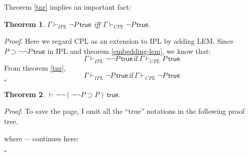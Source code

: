 \documentclass{article}
\newtheorem{theorem}{Theorem}[section]
\newenvironment{proof}{\emph{Proof}.}{\hfill$\square$}
\newcommand{\true}{\,\textsf{true}}
\begin{document}
Theorem \ref{tnr} implies an important fact:
\begin{theorem}
    $\Gamma \vdash_{IPL} \neg P \true$ \emph{iff} $\Gamma \vdash_{CPL} \neg P \true$.
\end{theorem}
\begin{proof}
    Here we regard CPL as an extension to IPL by adding LEM.
    Since $P\supset \neg\neg P\true$ in IPL and theorem \ref{embedding-lem}, we know that:
    \[
        \Gamma \vdash_{IPL} \neg\neg P\true \, \text{if}\, \Gamma \vdash_{CPL} P\true
    \]
    From theorem \ref{tnr},
    \[
        \Gamma \vdash_{IPL} \neg P\true \, \text{if}\, \Gamma \vdash_{CPL} \neg P\true
    \]
\end{proof}

\begin{theorem}
    $\vdash \neg\neg (\neg\neg P\supset P)\true$.
\end{theorem}
\begin{proof}
    To save the page, I omit all the ``\textsf{true}'' notations in the following proof tree.
    \begin{mathpar}
    \end{mathpar}
    where $\cdots$ continues here:
    \begin{mathpar}

    \end{mathpar}
\end{proof}
\end{document}
